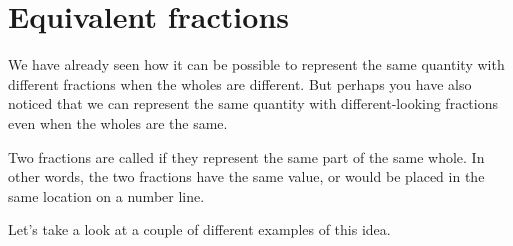 \documentclass{ximera}
\begin{document}
\section{Equivalent fractions}

We have already seen how it can be possible to represent the same quantity with different fractions when the wholes are different. But perhaps you have also noticed that we can represent the same quantity with different-looking fractions even when the wholes are the same.

\begin{definition}
Two fractions are called  if they represent the same part of the same whole. In other words, the two fractions have the same value, or would be placed in the same location on a number line.
\end{definition}

Let's take a look at a couple of different examples of this idea.
\end{document}
